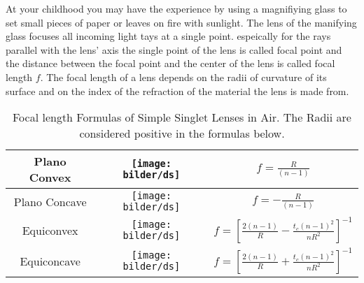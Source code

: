 At your childhood you may have the experience by using a magnifiying glass to set small pieces of paper or leaves on fire with sunlight. The lens of the manifying glass focuses all incoming light tays at a single point. espeically for the rays parallel with the lens' axis the single point of the lens is called focal point and the distance between the focal point and the center of the lens is called focal length $f$.
The focal length of a lens depends on the radii of curvature of its surface and on the index of the refraction of the material the lens is made from.

\begin{table}
\begin{tabular}{|c|c|c|}
\hline
Plano Convex & \parbox[c]{2.1cm}{\texttt{[image: bilder/ds]}}& $f=\frac{R}{(n-1)}$ \\
\hline
Plano Concave &\parbox[c]{2.1cm}{\texttt{[image: bilder/ds]}} & $f=-\frac{R}{(n-1)}$ \\
\hline
Equiconvex & \parbox[c]{2.1cm}{\texttt{[image: bilder/ds]}} & $f=[\frac{2(n-1)}{R} - \frac{t_{c}(n-1)^2}{nR^2}]^{-1}$ \\
\hline
Equiconcave & \parbox[c]{2.1cm}{\texttt{[image: bilder/ds]}} & $f=[\frac{2(n-1)}{R} + \frac{t_{c}(n-1)^2}{nR^2}]^{-1}$ \\
\hline
\end{tabular}
\caption{Focal length Formulas of Simple Singlet Lenses in Air.  
				 The Radii are considered positive in the formulas below.}
\label{lenses_focal_length}
\end{table}
	